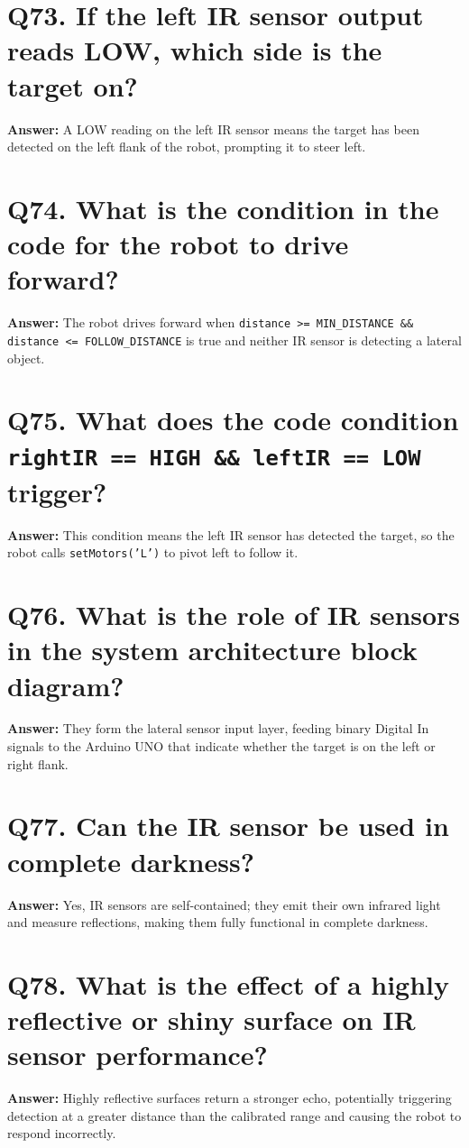 \documentclass[12pt,a4paper,oneside]{report}
\begin{document}
\section{Q73. If the left IR sensor output reads LOW, which side is the target on?}
\textbf{Answer:} A LOW reading on the left IR sensor means the target has been detected on the left flank of the robot, prompting it to steer left.

\section{Q74. What is the condition in the code for the robot to drive forward?}
\textbf{Answer:} The robot drives forward when \texttt{distance >= MIN\_DISTANCE \&\& distance <= FOLLOW\_DISTANCE} is true and neither IR sensor is detecting a lateral object.

\section{Q75. What does the code condition \texttt{rightIR == HIGH \&\& leftIR == LOW} trigger?}
\textbf{Answer:} This condition means the left IR sensor has detected the target, so the robot calls \texttt{setMotors('L')} to pivot left to follow it.

\section{Q76. What is the role of IR sensors in the system architecture block diagram?}
\textbf{Answer:} They form the lateral sensor input layer, feeding binary Digital In signals to the Arduino UNO that indicate whether the target is on the left or right flank.

\section{Q77. Can the IR sensor be used in complete darkness?}
\textbf{Answer:} Yes, IR sensors are self-contained; they emit their own infrared light and measure reflections, making them fully functional in complete darkness.

\section{Q78. What is the effect of a highly reflective or shiny surface on IR sensor performance?}
\textbf{Answer:} Highly reflective surfaces return a stronger echo, potentially triggering detection at a greater distance than the calibrated range and causing the robot to respond incorrectly.
\end{document}

